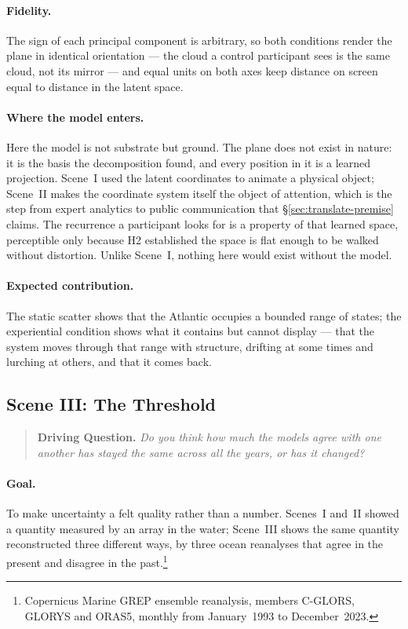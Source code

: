\paragraph{Fidelity.} The sign of each principal component is arbitrary, so both conditions render the plane in identical orientation --- the cloud a control participant sees is the same cloud, not its mirror --- and equal units on both axes keep distance on screen equal to distance in the latent space.

\paragraph{Where the model enters.} Here the model is not substrate but ground. The plane does not exist in nature: it is the basis the decomposition found, and every position in it is a learned projection. Scene~I used the latent coordinates to animate a physical object; Scene~II makes the coordinate system itself the object of attention, which is the step from expert analytics to public communication that \S\ref{sec:translate-premise} claims. The recurrence a participant looks for is a property of that learned space, perceptible only because H2 established the space is flat enough to be walked without distortion. Unlike Scene~I, nothing here would exist without the model.

\paragraph{Expected contribution.} The static scatter shows that the Atlantic occupies a bounded range of states; the experiential condition shows what it contains but cannot display --- that the system moves through that range with structure, drifting at some times and lurching at others, and that it comes back.

\subsection{Scene III: The Threshold}
\label{subsec:scene-threshold}

\begin{quote}
\textbf{Driving Question.} \emph{Do you think how much the models agree with one another has stayed the same across all the years, or has it changed?}
\end{quote}



\paragraph{Goal.} To make uncertainty a felt quality rather than a number. Scenes~I and~II showed a quantity measured by an array in the water; Scene~III shows the same quantity reconstructed three different ways, by three ocean reanalyses that agree in the present and disagree in the past.\footnote{Copernicus Marine GREP ensemble reanalysis, members C-GLORS, GLORYS and ORAS5, monthly from January~1993 to December~2023.}

